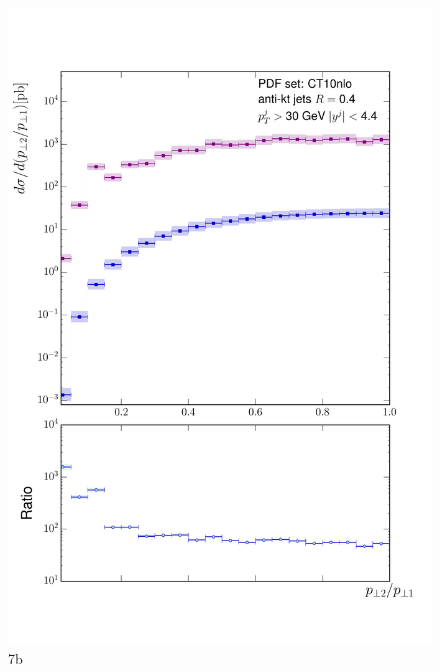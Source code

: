 	\begin{figure}[h]
		\centering
		\includegraphics[width=0.8\linewidth]{Figures/ATLAS_Z_100TeV_7b.pdf}
		\caption{7b}
		\label{fig:emissionsites}
	\end{figure}

